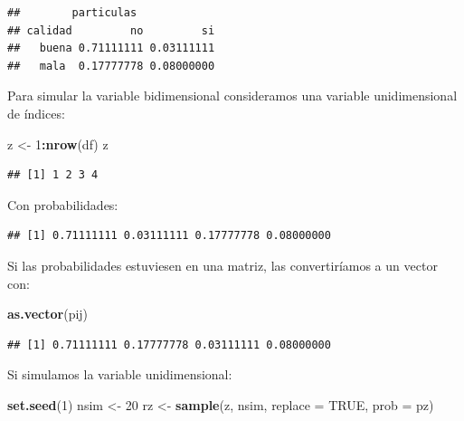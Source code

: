 \documentclass[]{book}
\newenvironment{Shaded}{\begin{snugshade}}{\end{snugshade}}
\newcommand{\KeywordTok}[1]{\textcolor[rgb]{0.13,0.29,0.53}{\textbf{#1}}}
\newcommand{\DataTypeTok}[1]{\textcolor[rgb]{0.13,0.29,0.53}{#1}}
\newcommand{\DecValTok}[1]{\textcolor[rgb]{0.00,0.00,0.81}{#1}}
\newcommand{\StringTok}[1]{\textcolor[rgb]{0.31,0.60,0.02}{#1}}
\newcommand{\OtherTok}[1]{\textcolor[rgb]{0.56,0.35,0.01}{#1}}
\newcommand{\OperatorTok}[1]{\textcolor[rgb]{0.81,0.36,0.00}{\textbf{#1}}}
\newcommand{\NormalTok}[1]{#1}
\theoremstyle{definition}
\theoremstyle{definition}
\theoremstyle{definition}
\theoremstyle{remark}
\begin{document}
\begin{verbatim}
##        particulas
## calidad         no         si
##   buena 0.71111111 0.03111111
##   mala  0.17777778 0.08000000
\end{verbatim}

Para simular la variable bidimensional consideramos una variable
unidimensional de índices:

\begin{Shaded}
\begin{Highlighting}[]
\NormalTok{z <-}\StringTok{ }\DecValTok{1}\OperatorTok{:}\KeywordTok{nrow}\NormalTok{(df)}
\NormalTok{z}
\end{Highlighting}
\end{Shaded}

\begin{verbatim}
## [1] 1 2 3 4
\end{verbatim}

Con probabilidades:

\begin{Shaded}
\end{Shaded}

\begin{verbatim}
## [1] 0.71111111 0.03111111 0.17777778 0.08000000
\end{verbatim}

Si las probabilidades estuviesen en una matriz, las convertiríamos a un
vector con:

\begin{Shaded}
\begin{Highlighting}[]
\KeywordTok{as.vector}\NormalTok{(pij)}
\end{Highlighting}
\end{Shaded}

\begin{verbatim}
## [1] 0.71111111 0.17777778 0.03111111 0.08000000
\end{verbatim}

Si simulamos la variable unidimensional:

\begin{Shaded}
\begin{Highlighting}[]
\KeywordTok{set.seed}\NormalTok{(}\DecValTok{1}\NormalTok{)}
\NormalTok{nsim <-}\StringTok{ }\DecValTok{20}
\NormalTok{rz <-}\StringTok{ }\KeywordTok{sample}\NormalTok{(z, nsim, }\DataTypeTok{replace =} \OtherTok{TRUE}\NormalTok{, }\DataTypeTok{prob =}\NormalTok{ pz)}
\end{Highlighting}
\end{Shaded}
\end{document}
